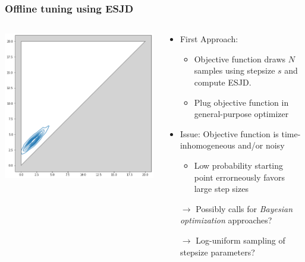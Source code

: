 \begin{frame}[t]
    \frametitle{Offline tuning using ESJD}
    \begin{columns}
        \begin{column}{0.4\textwidth}
            \centering
            \includegraphics[width=\textwidth]{imgs/time-inhomogeneous}
        \end{column}
        \begin{column}{0.5\textwidth}
            \begin{itemize}
                \item First Approach: 
                \begin{itemize}
                    \item Objective function draws $N$ samples using stepsize $s$ and compute ESJD.
                    \item Plug objective function in general-purpose optimizer
                \end{itemize}
                \item Issue: Objective function is time-inhomogeneous and/or noisy
                \begin{itemize}
                    \item Low probability starting point errorneously favors large step sizes
                \end{itemize}
                \item[]
                \item[$\to$] Possibly calls for \emph{Bayesian optimization} approaches?
                \item[$\to$] Log-uniform sampling of stepsize parameters?
            \end{itemize}
        \end{column}
    \end{columns}
\end{frame}

